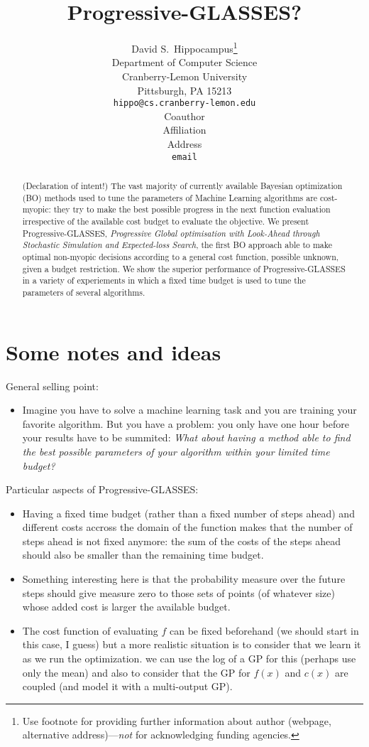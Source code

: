 \documentclass{article} %
\title{
    Progressive-GLASSES?
}
\author{
David S.~Hippocampus\thanks{ Use footnote for providing further information about author (webpage, alternative address)---\emph{not} for acknowledging funding agencies.} \\
Department of Computer Science\\
Cranberry-Lemon University\\
Pittsburgh, PA 15213 \\
\texttt{hippo@cs.cranberry-lemon.edu} \\
\And
Coauthor \\
Affiliation \\
Address \\
\texttt{email} \\
}
\begin{document}
\maketitle

\begin{abstract}

(Declaration of intent!) The vast majority of currently available Bayesian optimization (BO) methods used to tune the parameters of Machine Learning algorithms are cost-myopic: they try to make the best possible progress in the next function evaluation irrespective of  the available cost  budget to evaluate the objective.  We present Progressive-GLASSES, \emph{Progressive Global optimisation with Look-Ahead through Stochastic Simulation and Expected-loss Search}, the first BO approach able to make optimal non-myopic decisions according to a general cost function, possible unknown, given a budget restriction. We show the superior performance  of Progressive-GLASSES in a  variety of experiements in which a fixed time budget is used to tune the parameters of several algorithms. 




\end{abstract}

\section{Some notes and ideas} %
\label{sec:introduction}


General selling point:

\begin{itemize}
\item Imagine you have to solve a machine learning task and you are training your favorite algorithm. But you have a problem: you only have one hour before your results have to be summited: \emph{What about having a method able to find the best possible parameters of your algorithm within your limited time budget?}
\end{itemize}

Particular aspects of Progressive-GLASSES:

\begin{itemize}
\item Having a fixed time budget (rather than a fixed number of steps ahead) and different costs accross the domain of the function  makes that  the number of steps ahead is not fixed anymore: the sum of the costs of the steps ahead should also be smaller than the remaining time budget. 
\item Something interesting here is that the probability measure over the future steps should give measure zero to those sets of points (of whatever size) whose added cost is larger the available budget.
\item The cost function of evaluating $f$ can be fixed beforehand (we should start in this case, I guess) but a more realistic situation is to consider that we learn it as we run the optimization. we can use the log of a GP for this (perhaps use only the mean) and also to consider that the GP for $f(x)$ and $c(x)$ are coupled (and model it with a multi-output GP).
\end{itemize}
\end{document}
